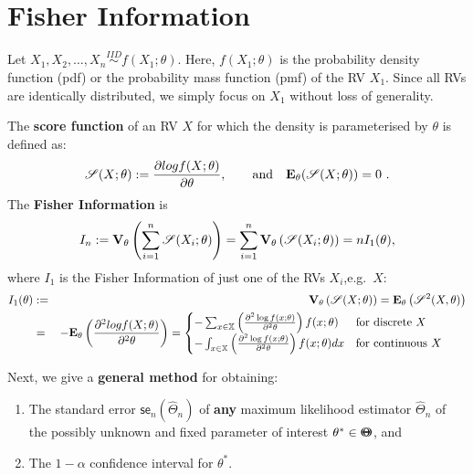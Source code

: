 \section{Fisher Information}\label{S:FisherInfo}
Let $X_1,X_2,\ldots,X_n \overset{IID}{\sim} f(X_1;\theta)$.  Here, $f(X_1;\theta)$ is the probability density function (pdf) or the probability mass function (pmf) of the RV $X_1$.  Since all RVs are identically distributed, we simply focus on $X_1$ without loss of generality.
\begin{definition}\label{D:FisherInfo}
The {\bf score function} of an RV $X$ for which the density is parameterised by $\theta$ is defined as:
\[
\mathscr{S}(X;\theta) := \frac{\partial log f(X;\theta)}{\partial \theta}, \qquad \text{and} \quad 
\mathbf{E}_{\theta} (\mathscr{S}(X;\theta))=0 \ .
\]
The {\bf Fisher Information} is
\begin{equation}\label{E:FisherInfo}
I_n := \mathbf{V}_{\theta} \left( \sum_{i=1}^n \mathscr{S}(X_i;\theta) \right) 
=  \sum_{i=1}^n \mathbf{V}_{\theta} \left( \mathscr{S}(X_i;\theta) \right) 
= n I_1(\theta),
\end{equation}
where $I_1$ is the Fisher Information of just one of the RVs $X_i$,e.g.~$X$:
\begin{eqnarray}
I_1 (\theta) &:=& \mathbf{V}_{\theta} \left( \mathscr{S}(X;\theta) \right) 
= \mathbf{E}_{\theta} \left(  \mathscr{S}^2(X,\theta) \right) \notag \\
&=& - \mathbf{E}_{\theta} \left(  \frac{\partial^2 log f(X;\theta)}{\partial^2 \theta} \right)
=
\begin{cases}
-\sum_{x \in \mathbb{X}}  \left( \frac{\partial^2 \log f(x;\theta)}{\partial^2 \theta} \right) f(x;\theta)  & \text{for discrete $X$}\\
-\int_{x \in \mathbb{X}}  \left( \frac{\partial^2 \log f(x;\theta)}{\partial^2 \theta} \right) f(x;\theta) dx  & \text{for continuous $X$} \qquad \label{E:FisherInfo1}
\end{cases}
\end{eqnarray}
\end{definition}
Next, we give a {\bf general method} for obtaining:
\begin{enumerate}
\item
The standard error $\mathsf{se}_n(\widehat{\Theta}_n)$ of {\bf any} maximum likelihood estimator $\widehat{\Theta}_n$ of the possibly unknown and fixed parameter of interest $\theta^* \in {\Theta}\mspace{-11 mu}{\Theta}$, and
\item The $1-\alpha$ confidence interval for $\theta^*$.
\end{enumerate}

